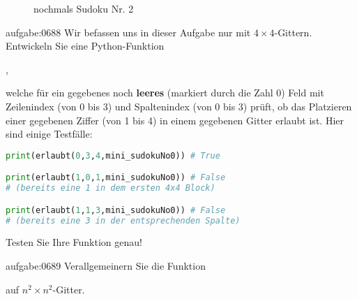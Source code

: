 \begin{figure}[H]
  \caption{nochmals Sudoku Nr. 2}
  \label{fig:sudoku0again}
\end{figure}
\noindent

\clearpage
\begin{aufgabe}{aufgabe:0688}
Wir befassen uns in dieser Aufgabe nur mit $4\times 4$-Gittern. Entwickeln Sie eine Python-Funktion
\begin{center}
  ,  
\end{center}
welche für ein gegebenes noch \textbf{leeres} (markiert durch die Zahl 0) Feld mit Zeilenindex  (von 0 bis 3) und Spaltenindex  (von 0 bis 3) prüft, ob das Platzieren einer gegebenen Ziffer  (von 1 bis 4) in einem gegebenen Gitter erlaubt ist. Hier sind einige Testfälle:
\begin{lstlisting}[language=Python,caption=erlaubt oder nicht,numbers=none]
print(erlaubt(0,3,4,mini_sudokuNo0)) # True

print(erlaubt(1,0,1,mini_sudokuNo0)) # False
# (bereits eine 1 in dem ersten 4x4 Block)

print(erlaubt(1,1,3,mini_sudokuNo0)) # False
# (bereits eine 3 in der entsprechenden Spalte)
\end{lstlisting}
Testen Sie Ihre Funktion genau!
\end{aufgabe}

\begin{aufgabe}{aufgabe:0689}
Verallgemeinern Sie die Funktion
\begin{center}
\end{center}
auf $n^2\times n^2$-Gitter.
\end{aufgabe}
  

